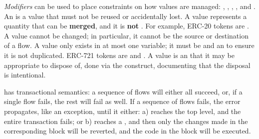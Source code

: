 \documentclass[nonacm, dvipsnames, sigconf]{acmart}
\begin{document}
\emph{Modifiers} can be used to place constraints on how values are managed: , , , , and .
An  is a value that must not be reused or accidentally lost.
A  value represents a quantity that can be \textbf{merged}, and it is \textbf{not} .
For example, ERC-20 tokens are .
A  value cannot be changed; in particular, it cannot be the source or destination of a flow.
A  value only exists in at most one variable; it must be  and an  to ensure it is not duplicated.
ERC-721 tokens are  and .
A  value is an  that it may be appropriate to dispose of, done via the  construct, documenting that the disposal is intentional.

\langName has transactional semantics: a sequence of flows will either all succeed, or, if a single flow fails, the rest will fail as well.
If a sequence of flows fails, the error propagates, like an exception, until it either: a) reaches the top level, and the entire transaction fails; or b) reaches a , and then only the changes made in the corresponding  block will be reverted, and the code in the  block will be executed.
\end{document}
